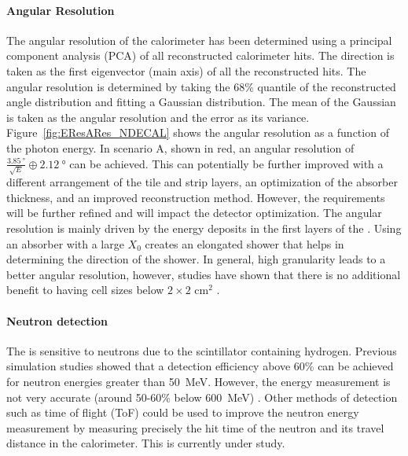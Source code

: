 \paragraph{Angular Resolution} The angular resolution of the calorimeter has been determined using a principal component analysis (PCA) of all reconstructed calorimeter hits. The direction is taken as the first eigenvector (main axis) of all the reconstructed hits. The angular resolution is determined by taking the 68\% quantile of the reconstructed angle distribution and fitting a Gaussian distribution. The mean of the Gaussian is taken as the angular resolution and the error as its variance. Figure~\ref{fig:EResARes_NDECAL} shows the angular resolution as a function of the photon energy. In scenario A, shown in red, an angular resolution of $\frac{\SI{3.85}{\degree}}{\sqrt{E}} \oplus \SI{2.12}{\degree}$ can be achieved. This can potentially be further improved with a different arrangement of the tile and strip layers, an optimization of the absorber thickness, and an improved reconstruction method. However, the requirements will be further refined and will impact the detector optimization. The angular resolution is mainly driven by the energy deposits in the first layers of the . Using an absorber with a large $X_{0}$ creates an elongated shower that helps in determining the direction of the shower. In general, high granularity leads to a better angular resolution, however, studies have shown that there is no additional benefit to having cell sizes below $2\times2$ cm$^2$ \cite{Emberger:2018pgr}.



\paragraph{Neutron detection} The  is sensitive to neutrons due to the scintillator containing hydrogen. Previous simulation studies showed that a detection efficiency above 60\% can be achieved for neutron energies greater than \SI{50}{\MeV}. However, the energy measurement is not very accurate (around 50-60\% below \SI{600}{\MeV}) \cite{Emberger:2018pgr}. Other methods of detection such as time of flight (ToF) could be used to improve the neutron energy measurement by measuring precisely the hit time of the neutron and its travel distance in the calorimeter.  This is currently under study.


